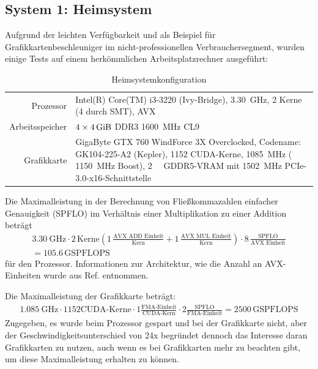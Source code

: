 \subsection{System 1: Heimsystem}
\label{sct:system1}


Aufgrund der leichten Verfügbarkeit und als Beispiel für Grafikkartenbeschleuniger im nicht-professionellen Verbrauchersegment, wurden einige Tests auf einem herkömmlichen Arbeitsplatzrechner ausgeführt:

\begin{table}[H]
	\begin{center}\begin{tabularx}{0.9\linewidth}{r|X}
	Prozessor & Intel(R) Core(TM) i3-3220 (Ivy-Bridge), \SI{3.30}{\giga\hertz}, 2 Kerne (4 durch SMT), AVX\cite{ark3220} \\
	Arbeitsspeicher & $4\times \SI{4}{\gibi\byte}$ DDR3 \SI{1600}{\mega\hertz} CL9\cite{corsair4gbddr3}\\
	\hline
	Grafikkarte & GigaByte GTX 760 WindForce 3X Overclocked, Codename: GK104-225-A2 (Kepler), 1152 CUDA-Kerne, \SI{1085}{\mega\hertz} ( \SI{1150}{\mega\hertz} Boost), \SI{2}{\gibi\byte} GDDR5-VRAM mit \SI{1502}{\mega\hertz} PCIe-3.0-x16-Schnittstelle\cite{gigabytegtx760,gtx760,nvidiakepler}
	\end{tabularx}\end{center}
	\caption{Heimsystemkonfiguration}
\end{table}

Die Maximalleistung in der Berechnung von Fließkommazahlen einfacher Genauigkeit (SPFLO) im Verhältnis einer Multiplikation zu einer Addition beträgt
\begin{align}
	\SI{3.30}{\giga\hertz} \cdot
	2\,\text{Kerne} \left(
		1\,\frac{ \text{AVX ADD Einheit} }{ \text{Kern} } +
		1\,\frac{ \text{AVX MUL Einheit} }{ \text{Kern} }
	\right) \cdot
	8\,\frac{ \text{SPFLO} }{ \text{AVX Einheit} } \\
	= 105.6\,\text{GSPFLOPS}
\end{align}
für den Prozessor. Informationen zur Architektur, wie die Anzahl an AVX-Einheiten wurde aus Ref.\cite{cesga} entnommen.

Die Maximalleistung der Grafikkarte beträgt:
\begin{align}
	\SI{1.085}{\giga\hertz} \cdot 1152 \text{CUDA-Kerne} \cdot
	1 \frac{ \text{FMA-Einheit} }{ \text{CUDA-Kern} } \cdot
	2 \frac{ \text{SPFLO} }{ \text{FMA-Einheit} }
	= 2500\,\text{GSPFLOPS}
\end{align}
Zugegeben, es wurde beim Prozessor gespart und bei der Grafikkarte nicht, aber der Geschwindigkeitsunterschied von 24x begründet dennoch das Interesse daran Grafikkarten zu nutzen, auch wenn es bei Grafikkarten mehr zu beachten gibt, um diese Maximalleistung erhalten zu können.



